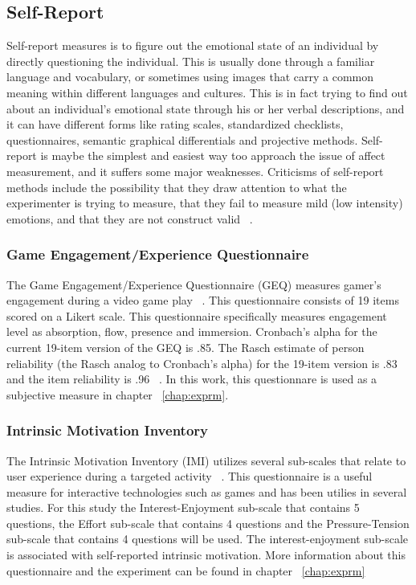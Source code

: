 \subsection{Self-Report}
Self-report measures is to figure out the emotional state of an individual by directly questioning the individual. This is usually done through a familiar language and vocabulary, or sometimes using images that carry a common meaning within different languages and cultures. This is in fact trying to find out about an individual's emotional state through his or her verbal descriptions, and it can have different forms like rating scales, standardized checklists, questionnaires, semantic graphical differentials and projective methods. Self-report is maybe the simplest and easiest way too approach the issue of affect measurement, and it suffers some major weaknesses. Criticisms of self-report methods include the possibility that they draw attention to what the experimenter is trying to measure, that they fail to measure mild (low intensity) emotions, and that they are not construct valid ~\cite{isen2007some}.

\subsubsection{Game Engagement/Experience Questionnaire}
The Game Engagement/Experience Questionnaire (GEQ) measures gamer's engagement during a video game play ~\cite{brockmyer2009development}. This questionnaire consists of 19 items scored on a Likert scale. This questionnaire specifically measures engagement level as absorption, flow, presence and immersion. Cronbach’s alpha for the current 19-item version of the GEQ is .85. The Rasch estimate of person reliability (the Rasch analog to Cronbach’s alpha) for the 19-item version is .83 and the item reliability is .96 ~\cite{brockmyer2009development}. In this work, this questionnare is used as a subjective measure in chapter ~\ref{chap:exprm}.

\subsubsection{Intrinsic Motivation Inventory}
The Intrinsic Motivation Inventory (IMI) utilizes several sub-scales that relate to user experience during a targeted activity ~\cite{ryan1983relation}. This questionnaire is a useful measure for interactive technologies such as games and has been utilies in several studies. For this study the Interest-Enjoyment sub-scale that contains 5 questions, the Effort sub-scale that contains 4 questions and the Pressure-Tension sub-scale that contains 4 questions will be used. The interest-enjoyment sub-scale is associated with self-reported intrinsic motivation. More information about this questionnaire and the experiment can be found in chapter ~\ref{chap:exprm}

